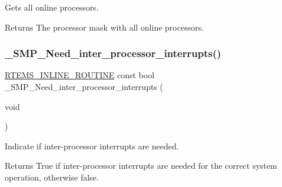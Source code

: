 Gets all online processors. 

\begin{DoxyReturn}{Returns}
The processor mask with all online processors. 
\end{DoxyReturn}
\mbox{\label{group__RTEMSScoreSMP_ga7a29d1349621da5955a51cbfcc6450f1}} 
\subsubsection{\texorpdfstring{\_SMP\_Need\_inter\_processor\_interrupts()}{\_SMP\_Need\_inter\_processor\_interrupts()}}
{\footnotesize\ttfamily \mbox{\hyperlink{group__RTEMSScoreBaseDefs_gac216239df231d5dbd15e3520b0b9313f}{R\+T\+E\+M\+S\+\_\+\+I\+N\+L\+I\+N\+E\+\_\+\+R\+O\+U\+T\+I\+NE}} const bool \+\_\+\+S\+M\+P\+\_\+\+Need\+\_\+inter\+\_\+processor\+\_\+interrupts (\begin{DoxyParamCaption}\item[{void}]{ }\end{DoxyParamCaption})}



Indicate if inter-\/processor interrupts are needed. 

\begin{DoxyReturn}{Returns}
True if inter-\/processor interrupts are needed for the correct system operation, otherwise false. 
\end{DoxyReturn}
